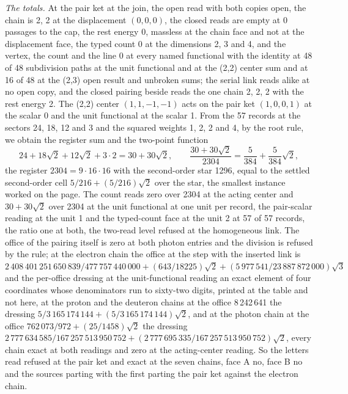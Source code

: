\begin{chproof}
\textit{The totals.} At the pair ket at the join, the open read with both copies open, the chain is 2, 2 at the displacement $(0, 0, 0)$, the closed reads are empty at 0 passages to the cap, the rest energy 0, massless at the chain face and not at the displacement face, the typed count 0 at the dimensions 2, 3 and 4, and the vertex, the count and the line 0 at every named functional with the identity at 48 of 48 subdivision paths at the unit functional and at the (2,2) center sum and at 16 of 48 at the (2,3) open result and unbroken sums; the serial link reads alike at no open copy, and the closed pairing beside reads the one chain 2, 2, 2 with the rest energy 2. The (2,2) center $(1, 1, -1, -1)$ acts on the pair ket $(1, 0, 0, 1)$ at the scalar 0 and the unit functional at the scalar 1. From the 57 records at the sectors 24, 18, 12 and 3 and the squared weights 1, 2, 2 and 4, by the root rule, we obtain the register sum and the two-point function
\begin{equation}
24 + 18\sqrt{2} + 12\sqrt{2} + 3\cdot 2 = 30 + 30\sqrt{2}, \qquad \frac{30 + 30\sqrt{2}}{2304} = \frac{5}{384} + \frac{5}{384}\sqrt{2},
\end{equation}
the register $2304 = 9\cdot 16\cdot 16$ with the second-order star 1296, equal to the settled second-order cell $5/216 + (5/216)\sqrt{2}$ over the star, the smallest instance worked on the page. The count reads zero over 2304 at the acting center and $30 + 30\sqrt{2}$ over 2304 at the unit functional at one unit per record, the pair-scalar reading at the unit 1 and the typed-count face at the unit 2 at 57 of 57 records, the ratio one at both, the two-read level refused at the homogeneous link. The office of the pairing itself is zero at both photon entries and the division is refused by the rule; at the electron chain the office at the step with the inserted link is $2\,408\,401\,251\,650\,839/477\,757\,440\,000 + (643/18225)\sqrt{2} + (5\,977\,541/23\,887\,872\,000)\sqrt{3}$ and the per-office dressing at the unit-functional reading an exact element of four coordinates whose denominators run to sixty-two digits, printed at the table and not here, at the proton and the deuteron chains at the office 8\,242\,641 the dressing $5/3\,165\,174\,144 + (5/3\,165\,174\,144)\sqrt{2}$, and at the photon chain at the office $762\,073/972 + (25/1458)\sqrt{2}$ the dressing $2\,777\,634\,585/167\,257\,513\,950\,752 + (2\,777\,695\,335/167\,257\,513\,950\,752)\sqrt{2}$, every chain exact at both readings and zero at the acting-center reading. So the letters read refused at the pair ket and exact at the seven chains, face A no, face B no and the sources parting with the first parting the pair ket against the electron chain.


\end{chproof}
